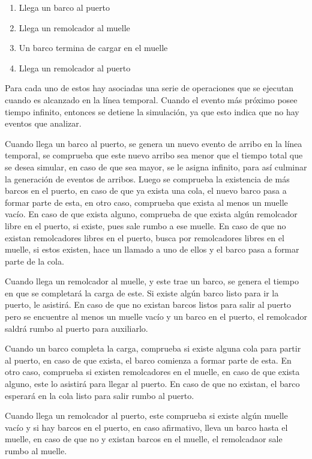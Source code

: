 \documentclass[titlepage,11pt]{scrartcl}
\begin{document}
	\begin{enumerate}
		\item Llega un barco al puerto
		\item Llega un remolcador al muelle
		\item Un barco termina de cargar en el muelle
		\item Llega un remolcador al puerto
	\end{enumerate}

	Para cada uno de estos hay asociadas una serie de operaciones que se ejecutan cuando es alcanzado en la línea temporal. Cuando el evento más próximo posee tiempo infinito, entonces se detiene la simulación, ya que esto indica que no hay eventos que analizar. 
	
	Cuando llega un barco al puerto, se genera un nuevo evento de arribo en la línea temporal, se comprueba que este nuevo arribo sea menor que el tiempo total que se desea simular, en caso de que sea mayor, se le asigna infinito, para así culminar la generación de eventos de arribos. Luego se comprueba la existencia de más barcos en el puerto, en caso de que ya exista una cola, el nuevo barco pasa a formar parte de esta, en otro caso, comprueba que exista al menos un muelle vacío. En caso de que exista alguno, comprueba de que exista algún remolcador libre en el puerto, si existe, pues sale rumbo a ese muelle. En caso de que no existan remolcadores libres en el puerto, busca por remolcadores libres en el muelle, si estos existen, hace un llamado a uno de ellos y el barco pasa a formar parte de la cola.

	Cuando llega un remolcador al muelle, y este trae un barco, se genera el tiempo en que se completará la carga de este. Si existe algún barco listo para ir la puerto, le asistirá. En caso de que no existan barcos listos para salir al puerto pero se encuentre al menos un muelle vacío y un barco en el puerto, el remolcador saldrá rumbo al puerto para auxiliarlo.

	Cuando un barco completa la carga, comprueba si existe alguna cola para partir al puerto, en caso de que exista, el barco comienza a formar parte de esta. En otro caso, comprueba si existen remolcadores en el muelle, en caso de que exista alguno, este lo asistirá para llegar al puerto. En caso de que no existan, el barco esperará en la cola listo para salir rumbo al puerto.

	Cuando llega un remolcador al puerto, este comprueba si existe algún muelle vacío y si hay barcos en el puerto, en caso afirmativo, lleva un barco hasta el muelle, en caso de que no y existan barcos en el muelle, el remolcadaor sale rumbo al muelle.
\end{document}

